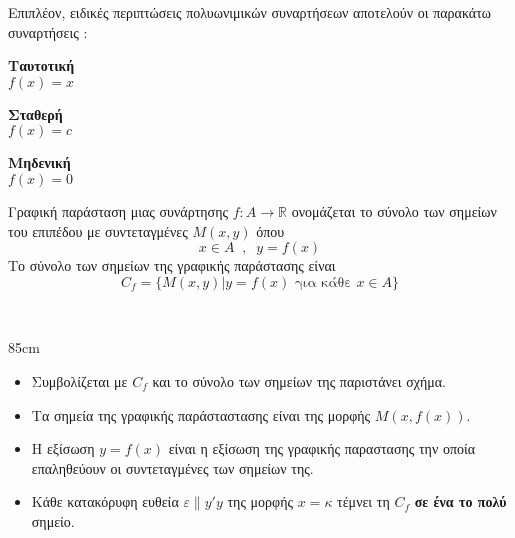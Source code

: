 \documentclass[twoside,nofonts,internet,shmeiwseis]{thewria}
\begin{document}
Επιπλέον, ειδικές περιπτώσεις πολυωνιμικών συναρτήσεων αποτελούν οι παρακάτω συναρτήσεις :
\begin{center}
\begin{minipage}{2.5cm}
\textbf{Ταυτοτική}\\$ f(x)=x $
\end{minipage}\qquad
\begin{minipage}{2.5cm}
\textbf{Σταθερή}\\$ f(x)=c $
\end{minipage}\qquad
\begin{minipage}{2.5cm}
\textbf{Μηδενική}\\$ f(x)=0 $
\end{minipage}
\end{center}
\vspace{2mm}
Γραφική παράσταση μιας συνάρτησης $ f:A\rightarrow\mathbb{R} $ ονομάζεται το σύνολο των σημείων του επιπέδου με συντεταγμένες $ M(x,y) $ όπου \[ x\in A\;\;,\;\;y=f(x) \]
Το σύνολο των σημείων της γραφικής παράστασης είναι 
\[ C_f=\{M(x,y)|y=f(x)\textrm{ για κάθε }x\in A\} \]
\begin{minipage}{\linewidth}\mbox{}\\
\vspace{-1.2cm}
\begin{WrapText1}{8}{5cm}
\vspace{0mm}
\end{WrapText1}
\begin{itemize}[itemsep=0mm]
\item Συμβολίζεται με $ C_f $ και το σύνολο των σημείων της παριστάνει σχήμα.
\item Τα σημεία της γραφικής παράσταστασης είναι της μορφής $Μ\left(x,f(x)\right) $.
\item Η εξίσωση $ y=f(x) $ είναι η εξίσωση της γραφικής παραστασης την οποία επαληθεύουν οι συντεταγμένες των σημείων της.
\item Κάθε κατακόρυφη ευθεία $ \varepsilon\parallel y'y $ της μορφής $ x=\kappa $ τέμνει τη $ C_f $ \textbf{σε ένα το πολύ} σημείο.
\end{itemize}\end{minipage}\mbox{}\\\\\\
\end{document}
